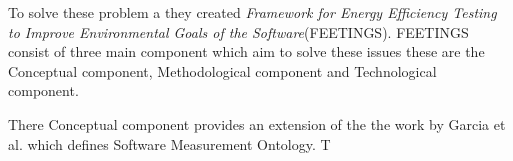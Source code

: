 To solve these problem a they created \textit{Framework for Energy Efficiency Testing to Improve Environmental Goals of the Software}(FEETINGS). FEETINGS consist of three main component which aim to solve these issues these are the Conceptual component, Methodological component and Technological component.\nytafsnit

There Conceptual component provides an extension of the the work by Garcia et al. which defines Software Measurement Ontology\cite{GARCIA2006631}. T






